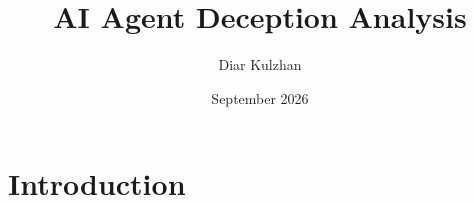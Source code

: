 \documentclass[11pt,a4paper]{article}
\title{AI Agent Deception Analysis}
\author{Diar Kulzhan}
\date{September 2026}
\begin{document}
\maketitle

\section{Introduction}
\end{document}

